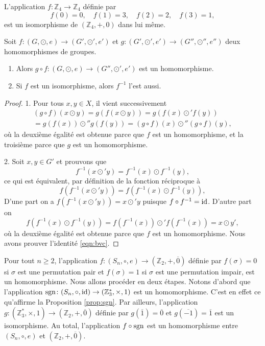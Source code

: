 \documentclass[french,course,oneside,theoremnosection]{lecture}
\newcommand{\Z}{\mathbb{Z}}
\begin{document}
\begin{example}
L'application $f\colon \Z_4 \to \Z_4$ définie par
\[
f(0)=0, \quad f(1)=3, \quad f(2)=2, \quad f(3)=1,
\]
est un isomorphisme de $(\Z_4,+,  0)$ dans lui même.
\end{example}

\begin{proposition}Soit $f\colon (G, \odot, e) \to (G', \odot', e')$ et $g\colon (G', \odot', e') \to (G'', \odot'', e'')$ deux homomorphismes de groupes.
\begin{enumerate}
\item Alors $g\circ f \colon (G, \odot, e) \to (G'', \odot', e')$ est un homomorphisme.
\item Si $f$ est un isomorphisme, alors $f^{-1}$ l'est aussi.
\end{enumerate}
\end{proposition}
\begin{proof}
1. Pour tous $x,y \in X$, il vient successivement
\begin{multline*}
(g\circ f)(x\odot y) = g(f(x\odot y)) = g(f(x)\odot' f(y))\\ =g(f(x))\odot'' g(f(y)) = (g\circ f)(x) \odot'' (g\circ f)(y),
\end{multline*}
où la deuxième égalité est obtenue parce que $f$ est un homomorphisme, et la troisième parce que $g$ est un homomorphisme.

2. Soit $x, y \in G'$ et prouvons que
\[
f^{-1}(x \odot' y) = f^{-1}(x) \odot f^{-1}(y),
\]
ce qui est équivalent, par définition de la fonction réciproque à
\begin{equation}\label{eqn:bvc}
f(f^{-1}(x \odot' y)) = f(f^{-1}(x) \odot f^{-1}(y)),
\end{equation}
D'une part on a $f(f^{-1}(x \odot' y))=x \odot' y$ puisque $f\circ f^{-1}=\operatorname{id}$. D'autre part on 
\[
f(f^{-1}(x) \odot f^{-1}(y)) = f(f^{-1}(x)) \odot' f(f^{-1}(x)) = x\odot y',
\]
où la deuxième égalité est obtenue parce que $f$ est un homomorphisme. Nous avons prouver l'identité \eqref{eqn:bvc}.
\end{proof}

\begin{example}
Pour tout $n\geq 2$, l'application $f\colon (S_n, \circ, e) \to (\Z_2, +, \overline{0})$ définie par $f(\sigma) = 0$ si $\sigma$ est une permutation pair et $f(\sigma) = 1$ si $\sigma$ est une permutation impair, est un homomorphisme. Nous allons procéder en deux étapes. Notons d'abord que l'application $\sgn\colon (S_n, \circ, \id)  \to (\Z_3^*, \times, 1)$ est un homomorphisme. C'est en effet ce qu'affirme la Proposition \ref{prop:sgn}. Par ailleurs, l'application $g\colon (\Z_3^*, \times, 1)  \to (\Z_2, +, \overline{0})$ définie par $g(\overline{1})=\overline{0}$ et $g(\overline{-1})= \overline{1}$ est un isomorphisme. Au total, l'application $f\circ\operatorname{sgn}$ est un homomorphisme entre $(S_n,  \circ, e)$ et $(\Z_2, +, \overline{0})$.
\end{example}
\end{document}
